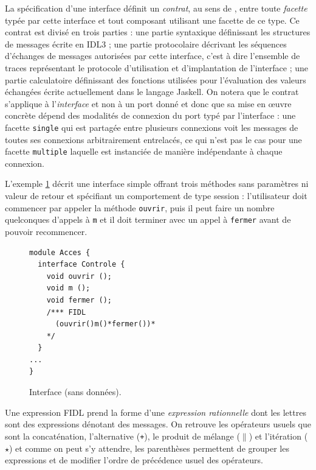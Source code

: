 La sp\'ecification d'une interface d\'efinit un \emph{contrat}, au sens de \cite{meyer}, entre toute
\emph{facette} typ\'ee par cette interface et tout composant utilisant une
facette de ce type. Ce contrat est divis\'e en trois parties : une
partie syntaxique d\'efinissant les structures de messages \'ecrite
en \textsf{IDL3} ; une
partie protocolaire d\'ecrivant les s\'equences d'\'echanges de messages
autoris\'ees par cette interface, c'est \`a dire l'ensemble de
traces repr\'esentant le protocole d'utilisation et d'implantation de
l'interface ; une partie calculatoire d\'efinissant
des fonctions utilis\'ees pour l'\'evaluation des valeurs
\'echang\'ees \'ecrite actuellement dans le langage \textsf{Jaskell}. On
notera que le contrat s'applique \`a l'\emph{interface} et non \`a
un port donn\'e et donc que sa mise en \oe uvre concr\`ete d\'epend
des modalit\'es de connexion du port typ\'e par l'interface : une
facette \texttt{single} qui est partag\'ee entre plusieurs connexions
voit les messages de toutes ses connexions arbitrairement
entrelac\'es, ce qui n'est pas le cas pour une facette
\texttt{multiple} laquelle est instanci\'ee de mani\`ere
ind\'ependante \`a chaque connexion.

L'exemple \ref{fig-ex1} d\'ecrit une interface simple offrant trois
m\'ethodes sans param\`etres ni valeur de retour et sp\'ecifiant un
comportement de type \og session \fg : l'utilisateur doit commencer par
appeler la m\'ethode \texttt{ouvrir}, puis il peut faire un nombre
quelconques d'appels \`a \texttt{m} et il doit terminer avec un appel \`a
\texttt{fermer} avant de pouvoir recommencer. 

\begin{figure}[h]
\centering
\begin{lstlisting}
module Acces {   
  interface Controle {
    void ouvrir ();
    void m ();
    void fermer ();
    /*** FIDL
      (ouvrir()m()*fermer())*
    */
  }
...
}
\end{lstlisting}
    \caption{Interface (sans donn\'ees).}
    \label{fig-ex1}
\end{figure}

Une expression
\textsf{FIDL} prend la forme d'une \emph{expression rationnelle} dont les lettres sont
des expressions d\'enotant des messages. On retrouve les op\'erateurs
usuels que sont la concat\'enation, l'alternative (\texttt{+}), le
produit de m\'elange ($\parallel$) et l'it\'eration ($\star$) et comme on peut s'y
attendre, les parenth\`eses permettent de grouper les expressions et de
modifier l'ordre de pr\'ec\'edence usuel des op\'erateurs.

